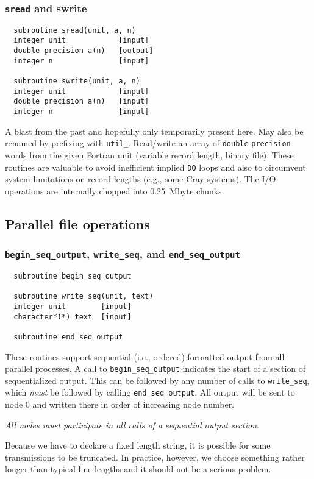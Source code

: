\subsubsection{{\tt sread} and {swrite}}
\begin{verbatim}
  subroutine sread(unit, a, n)
  integer unit            [input]
  double precision a(n)   [output]
  integer n               [input]

  subroutine swrite(unit, a, n)
  integer unit            [input]
  double precision a(n)   [input]
  integer n               [input]
\end{verbatim}
A blast from the past and hopefully only temporarily present here.
May also be renamed by prefixing with \verb+util_+.  Read/write an
array of {\tt double} {\tt precision} words from the given Fortran
unit (variable record length, binary file).  These routines are
valuable to avoid inefficient implied {\tt DO} loops and also to
circumvent system limitations on record lengths (e.g., some Cray
systems).  The I/O operations are internally chopped into 0.25~Mbyte
chunks.

\subsection{Parallel file operations}

\subsubsection{{\tt begin\_seq\_output}, {\tt write\_seq}, and {\tt end\_seq\_output}}
\begin{verbatim}
  subroutine begin_seq_output

  subroutine write_seq(unit, text)
  integer unit        [input]
  character*(*) text  [input]

  subroutine end_seq_output
\end{verbatim}
These routines support sequential (i.e., ordered) formatted output
from all parallel processes.  A call to \verb+begin_seq_output+
indicates the start of a section of sequentialized output.  This can
be followed by any number of calls to \verb+write_seq+, which {\em
  must} be followed by calling \verb+end_seq_output+.  All output will
be sent to node 0 and written there in order of increasing node
number.

{\em All nodes must participate in all calls of a sequential output section}.

Because we have to declare a fixed length string, it is possible for
some transmissions to be truncated.  In practice, however, we choose
something rather longer than typical line lengths and it should not be
a serious problem.


